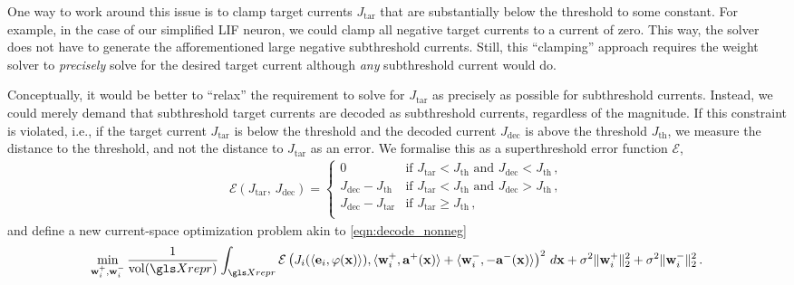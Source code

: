 One way to work around this issue is to clamp target currents $J_\mathrm{tar}$ that are substantially below the threshold to some constant.
For example, in the case of our simplified LIF neuron, we could clamp all negative target currents to a current of zero.
This way, the solver does not have to generate the afforementioned large negative subthreshold currents.
Still, this \enquote{clamping} approach requires the weight solver to \emph{precisely} solve for the desired target current although \emph{any} subthreshold current would do.

Conceptually, it would be better to \enquote{relax} the requirement to solve for $J_\mathrm{tar}$ as precisely as possible for subthreshold currents.
Instead, we could merely demand that subthreshold target currents are decoded as subthreshold currents, regardless of the magnitude.
If this constraint is violated, i.e., if the target current $J_\mathrm{tar}$ is below the threshold and the decoded current $J_\mathrm{dec}$ is above the threshold $J_\mathrm{th}$, we measure the distance to the threshold, and not the distance to $J_\mathrm{tar}$ as an error.
We formalise this as a superthreshold error function $\mathcal{E}$,
\begin{align}
\mathcal{E}(J_\mathrm{tar}, \, J_\mathrm{dec}) = \begin{cases}
0 & \text{if } J_\mathrm{tar} < J_\mathrm{th} \text{ and } J_\mathrm{dec} < J_\mathrm{th} \,,\\
J_\mathrm{dec} - J_\mathrm{th} & \text{if } J_\mathrm{tar} < J_\mathrm{th} \text{ and } J_\mathrm{dec} > J_\mathrm{th} \,,\\
J_\mathrm{dec} - J_\mathrm{tar} & \text{if } J_\mathrm{tar} \geq J_\mathrm{th} \,,\\
\end{cases}
\label{eqn:subthreshold_error}
\end{align}
and define a new current-space optimization problem akin to \cref{eqn:decode_nonneg}
\begin{align}
	\min_{\vec w_i^+, \vec w_i^-} 
	\frac{1}{\vol(\Xrepr)}
	\int_{\Xrepr} \mathcal{E}\left( 
		J_i(\langle \vec e_i, \phi(\vec x)\rangle),
		\langle \vec w_i^+, \vec a^+(\vec x) \rangle +
		\langle \vec w_i^-, -\vec a^-(\vec x) \rangle
	\right)^2 \, d\vec x
	+ \sigma^2 \| \vec w^+_i \|_\mathrm{2}^2
	+ \sigma^2 \| \vec w^-_i \|_\mathrm{2}^2\,.
\label{eqn:decode_current_subthreshold}
\end{align}


